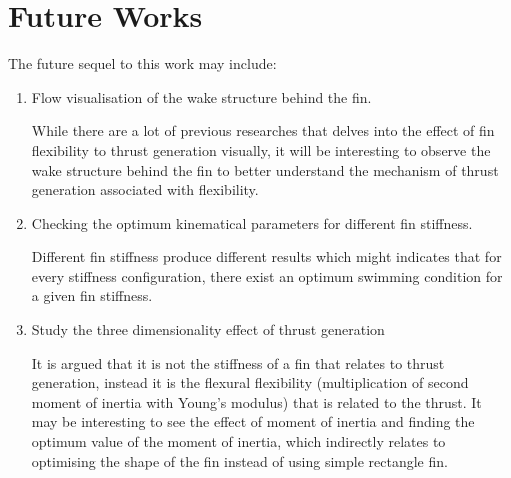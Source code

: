 \section{Future Works}
The future sequel to this work may include:
\begin{enumerate}
    \item Flow visualisation of the wake structure behind the fin.

    While there are a lot of previous researches that delves into the effect of fin flexibility to thrust generation visually, it will be interesting to observe the wake structure behind the fin to better understand the mechanism of thrust generation associated with flexibility.
    \item Checking the optimum kinematical parameters for different fin stiffness.

    Different fin stiffness produce different results which might indicates that for every stiffness configuration, there exist an optimum swimming condition for a given fin stiffness.
    \item Study the three dimensionality effect of thrust generation

    It is argued that it is not the stiffness of a fin that relates to thrust generation, instead it is the flexural flexibility (multiplication of second moment of inertia with Young's modulus) that is related to the thrust. It may be interesting to see the effect of moment of inertia and finding the optimum value of the moment of inertia, which indirectly relates to optimising the shape of the fin instead of using simple rectangle fin.
\end{enumerate}